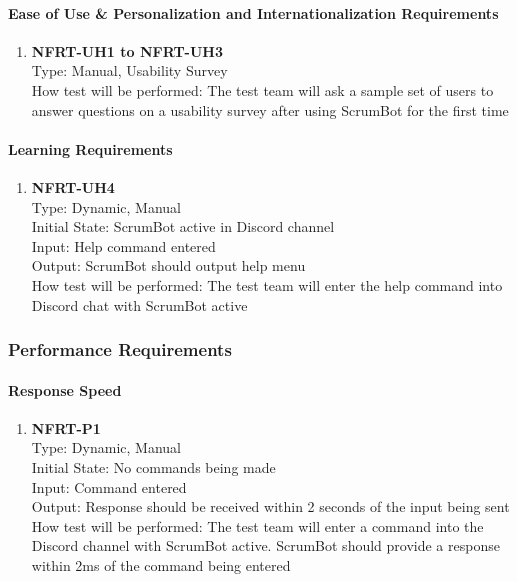 \documentclass[12pt, titlepage]{article}
\begin{document}
\paragraph{Ease of Use \& Personalization and Internationalization Requirements}
\begin{enumerate}
\item{\textbf{NFRT-UH1 to NFRT-UH3}}\\
Type: Manual, Usability Survey\\
How test will be performed: The test team will ask a sample set of users to answer questions on a usability survey after using ScrumBot for the first time
\end{enumerate}

\paragraph{Learning Requirements}
\begin{enumerate}
\item{\textbf{NFRT-UH4}}\\
Type: Dynamic, Manual\\
Initial State: ScrumBot active in Discord channel\\
Input: Help command entered\\
Output: ScrumBot should output help menu\\
How test will be performed: The test team will enter the help command into Discord chat with ScrumBot active
\end{enumerate}

\subsubsection{Performance Requirements}
\paragraph{Response Speed}
\begin{enumerate}
\item{\textbf{NFRT-P1}}\\
Type: Dynamic, Manual\\
Initial State: No commands being made\\
Input: Command entered\\
Output: Response should be received within 2 seconds of the input being sent\\
How test will be performed: The test team will enter a command into the Discord channel with ScrumBot active. ScrumBot should provide a response within 2ms of the command being entered
\end{enumerate}
\end{document}
